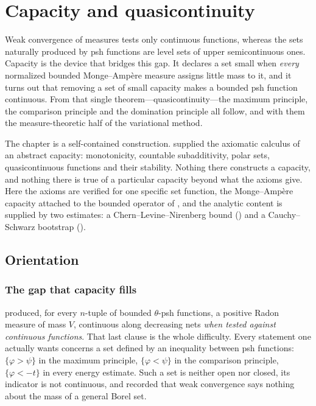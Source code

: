 \chapter{Capacity and quasicontinuity}
\label{chap:bfj-capacity}

Weak convergence of measures tests only continuous functions, whereas the
sets naturally produced by psh functions are level sets of upper
semicontinuous ones.  Capacity is the device that bridges this gap.  It
declares a set small when \emph{every} normalized bounded Monge--Amp\`ere
measure assigns little mass to it, and it turns out that removing a set of
small capacity makes a bounded psh function continuous.  From that single
theorem---quasicontinuity---the maximum principle, the comparison principle
and the domination principle all follow, and with them the measure-theoretic
half of the variational method.

The chapter is a self-contained construction.  
supplied the axiomatic calculus of an abstract capacity: monotonicity,
countable subadditivity, polar sets, quasicontinuous functions and their
stability.  Nothing there constructs a capacity, and nothing there is true of
a particular capacity beyond what the axioms give.  Here the axioms are
verified for one specific set function, the Monge--Amp\`ere capacity attached
to the bounded operator of , and the analytic content is
supplied by two estimates: a Chern--Levine--Nirenberg bound
() and a Cauchy--Schwarz bootstrap
().

\section{Orientation}
\label{sec:ch25-orientation}

\subsection{The gap that capacity fills}
\label{sec:ch25-gap}

 produced, for every $n$-tuple of bounded
$\theta$-psh functions, a positive Radon measure of mass $V$, continuous
along decreasing nets \emph{when tested against continuous functions}.  That
last clause is the whole difficulty.  Every statement one actually wants
concerns a set defined by an inequality between psh functions:
$\{\varphi>\psi\}$ in the maximum principle, $\{\varphi<\psi\}$ in the
comparison principle, $\{\varphi<-t\}$ in every energy estimate.  Such a
set is neither open nor closed, its indicator is not continuous, and
 recorded that weak convergence says nothing
about the mass of a general Borel set.

